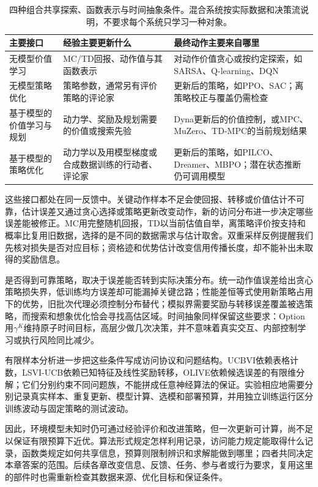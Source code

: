 \begin{table}[t]
  \centering
  \small
  \begin{tabularx}{\linewidth}{>{\raggedright\arraybackslash}p{28mm} >{\raggedright\arraybackslash}X >{\raggedright\arraybackslash}X}
    \toprule
    主要接口 & 经验主要更新什么 & 最终动作主要来自哪里 \\
    \midrule
    无模型价值学习 & MC/TD回报、动作值与其函数表示 & 对动作价值贪心或按约定探索，如SARSA、Q-learning、DQN \\
    无模型策略优化 & 策略参数，通常另有评价策略的评论家 & 更新后的策略，如PPO、SAC；离策略校正与覆盖仍需检查 \\
    基于模型的价值学习与规划 & 动力学、奖励及规划需要的价值或搜索先验 & Dyna更新后的价值控制，或MPC、MuZero、TD-MPC的当前规划结果 \\
    基于模型的策略优化 & 动力学以及用模型梯度或合成数据训练的行动者、评论家 & 更新后的策略，如PILCO、Dreamer、MBPO；潜在状态推断仍可调用模型 \\
    \bottomrule
  \end{tabularx}
  \caption{四种组合共享探索、函数表示与时间抽象条件。混合系统按实际数据和决策流说明，不要求每个系统只学习一种对象。}
  \label{tab:rl-learning-final-interfaces}
\end{table}

这些接口都处在同一反馈中。关键动作样本不足会使回报、转移或价值估计不可靠，估计误差又通过贪心选择或策略更新改变动作，新的访问分布进一步决定哪些误差能被修正。MC用完整随机回报，TD以当前估值自举，离策略评价按支持和概率比复用旧数据，选择的是不同的数据需求与估计取舍。双重采样反例提醒我们先核对损失是否对应目标；资格迹和优势估计改变信用传播长度，却不能补出未取得的奖励信息。

是否得到可靠策略，取决于误差能否转到实际决策分布。统一动作值误差给出贪心策略损失界，低训练均方误差却可能漏掉关键岔路；性能差恒等式使用新策略占用下的优势，旧批次代理必须控制分布替代；模拟界需要奖励与转移误差覆盖被选策略，而搜索和想象优化恰会寻找高估区域。时间抽象同样保留这些要求：Option用$\gamma^K$维持原子时间目标，高层少做几次决策，并不意味着真实交互、内部控制学习或执行风险同比减少。

有限样本分析进一步把这些条件写成访问协议和问题结构。UCBVI依赖表格计数，LSVI-UCB依赖已知特征及线性奖励转移，OLIVE依赖候选误差的有限维分解；它们分别约束不同问题族，不能拼成任意神经算法的保证。实验相应地需要分别记录真实样本、重复更新、模型计算、选模和部署预算，并用独立训练运行区分训练波动与固定策略的测试波动。

因此，环境模型未知时仍可通过经验评价和改进策略，但一次更新可计算，尚不足以保证有限预算下近优。算法形式规定怎样利用记录，访问能力规定能取得什么记录，函数类规定如何共享信息，预算则限制辨识和求解能做到哪里；四者共同决定本章答案的范围。后续各章改变信息、反馈、任务、参与者或行为要求，复用这里的部件时也需重新检查其数据来源、优化目标和保证条件。
